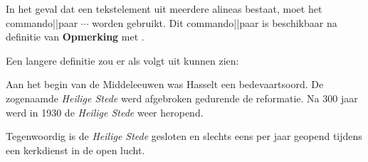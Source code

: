 \starttypen
\opmerking[-]
\stoptypen

In het geval dat een tekstelement uit meerdere alineas
bestaat, moet het commando||paar \type{\startopmerking}
$\cdots$ \type{\stopopmerking} worden gebruikt. Dit
commando||paar is beschikbaar na definitie van {\bf
Opmerking} met \type{\doornummeren[opmerking]}.

Een langere definitie zou er als volgt uit kunnen zien:

\startbuffer[c]
\startopmerking
Aan het begin van de Middeleeuwen was Hasselt een
bedevaartsoord. De zogenaamde {\em Heilige Stede} werd
afgebroken gedurende de reformatie. Na 300 jaar werd in 1930
de {\em Heilige Stede} weer heropend.

Tegenwoordig is de {\em Heilige Stede} gesloten en slechts
eens per jaar geopend tijdens een kerkdienst in de open lucht.
\stopopmerking
\stopbuffer

\typebuffer[c]

\start
\haalbuffer[a]\haalbuffer[c] \par
\stop

\stoponderdeel
